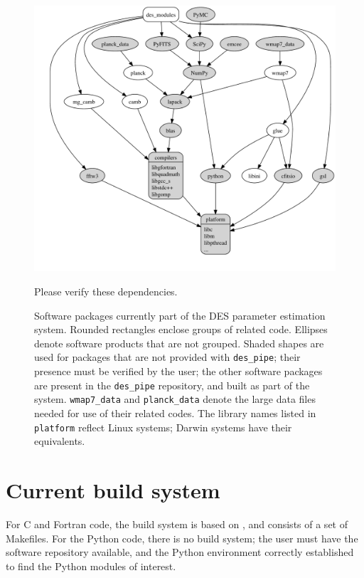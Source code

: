 \documentclass[draftmode,draftwater]{memarticle}
\newcommand{\despipe}{\name{des-pipe}\xspace}
\begin{document}
\begin{figure}
  \centering
    \includegraphics[height=\textheight,width=\textwidth,keepaspectratio=true]{astro_packages}
    \caption{Software packages currently part of the DES parameter
    estimation system. Rounded rectangles enclose groups of related
    code. Ellipses denote software products that are not grouped.
    Shaded shapes are used for packages that are not provided with
    \texttt{des\_pipe}; their presence must be verified by the user;
    the other software packages are present in the \texttt{des\_pipe}
    repository, and built as part of the system. \texttt{wmap7\_data}
    and \texttt{planck\_data} denote the large data files needed for
    use of their related codes. The library names listed in
    \texttt{platform} reflect Linux systems; Darwin systems have their
    equivalents.} \label{fig:astropackages}
    \begin{fixme}
    Please verify these dependencies.
    \end{fixme}
\end{figure}

\section{Current build system}

For C and Fortran code, the \despipe build system is based on
, and consists of a set of Makefiles. For the Python code,
there is no build system; the user must have the software repository
available, and the Python environment correctly established to find the
Python modules of interest.
\end{document}

